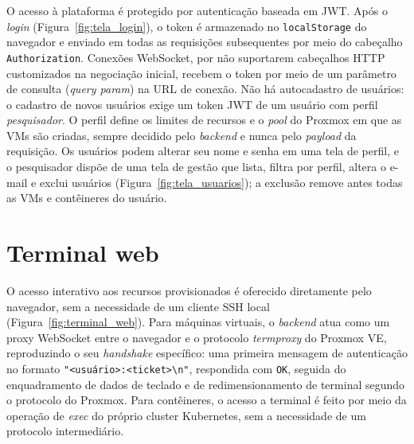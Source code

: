 O acesso à plataforma é protegido por autenticação baseada em JWT. Após o \textit{login} (Figura~\ref{fig:tela_login}), o token é armazenado no \texttt{localStorage} do navegador e enviado em todas as requisições subsequentes por meio do cabeçalho \texttt{Authorization}. Conexões WebSocket, por não suportarem cabeçalhos HTTP customizados na negociação inicial, recebem o token por meio de um parâmetro de consulta (\textit{query param}) na URL de conexão. Não há autocadastro de usuários: o cadastro de novos usuários exige um token JWT de um usuário com perfil \textit{pesquisador}. O perfil define os limites de recursos e o \textit{pool} do Proxmox em que as VMs são criadas, sempre decidido pelo \textit{backend} e nunca pelo \textit{payload} da requisição. Os usuários podem alterar seu nome e senha em uma tela de perfil, e o pesquisador dispõe de uma tela de gestão que lista, filtra por perfil, altera o e-mail e exclui usuários (Figura~\ref{fig:tela_usuarios}); a exclusão remove antes todas as VMs e contêineres do usuário.



\section{Terminal web}

O acesso interativo aos recursos provisionados é oferecido diretamente pelo navegador, sem a necessidade de um cliente SSH local (Figura~\ref{fig:terminal_web}). Para máquinas virtuais, o \textit{backend} atua como um proxy WebSocket entre o navegador e o protocolo \textit{termproxy} do Proxmox VE, reproduzindo o seu \textit{handshake} específico: uma primeira mensagem de autenticação no formato \texttt{"\textless usuário\textgreater :\textless ticket\textgreater\textbackslash n"}, respondida com \texttt{OK}, seguida do enquadramento de dados de teclado e de redimensionamento de terminal segundo o protocolo do Proxmox. Para contêineres, o acesso a terminal é feito por meio da operação de \textit{exec} do próprio cluster Kubernetes, sem a necessidade de um protocolo intermediário.


